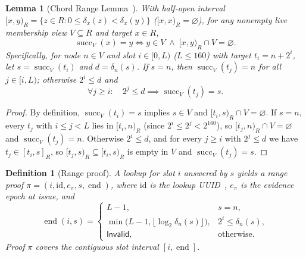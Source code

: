 \documentclass[journal]{IEEEtran}
\newtheorem{definition}{Definition}
\newtheorem{lemma}{Lemma}
\begin{document}
\begin{lemma}[Chord Range Lemma~\cite{Chord}]\label{lem:range}
With half-open interval $[x,y)_R=\{z\in R:0\le\delta_x(z)<\delta_x(y)\}$ ($[x,x)_R=\varnothing$), for any nonempty live membership view $V\subseteq R$ and target $x\in R$,
\[
  \operatorname{succ}_V(x)=y \iff y\in V \;\land\; [x,y)_R\cap V=\varnothing.
\]
Specifically, for node $n\in V$ and slot $i\in[0,L)$ ($L\le 160$) with target $t_i=n+2^i$, let $s=\operatorname{succ}_V(t_i)$ and $d=\delta_n(s)$. If $s=n$, then $\operatorname{succ}_V(t_j)=n$ for all $j\in[i,L)$; otherwise $2^i\le d$ and
\[
  \forall j\ge i:\quad 2^j\le d \implies \operatorname{succ}_V(t_j)=s.
\]
\end{lemma}
\begin{proof}
By definition, $\operatorname{succ}_V(t_i)=s$ implies $s\in V$ and $[t_i,s)_R\cap V=\varnothing$. If $s=n$, every $t_j$ with $i\le j<L$ lies in $[t_i,n)_R$ (since $2^i\le 2^j < 2^{160}$), so $[t_j,n)_R\cap V=\varnothing$ and $\operatorname{succ}_V(t_j)=n$. Otherwise $2^i\le d$, and for every $j\ge i$ with $2^j\le d$ we have $t_j\in[t_i,s]_R$, so $[t_j,s)_R\subseteq[t_i,s)_R$ is empty in $V$ and $\operatorname{succ}_V(t_j)=s$.
\end{proof}

\begin{definition}[Range proof]\label{def:range-proof}
A lookup for slot $i$ answered by $s$ yields a range proof
$\pi=(i,\mathrm{id},e_\pi,s,\operatorname{end})$, where $\mathrm{id}$ is the
lookup UUID~\cite{RFC9562}, $e_\pi$ is the evidence epoch at issue, and
\[
\operatorname{end}(i,s)=
\begin{cases}
L-1, & s=n,\\
\min\bigl(L-1,\lfloor\log_2\delta_n(s)\rfloor\bigr), & 2^i\le\delta_n(s),\\
\mathsf{Invalid}, & \text{otherwise.}
\end{cases}
\]
Proof $\pi$ covers the contiguous slot interval $[i,\operatorname{end}]$.
\end{definition}
\end{document}
